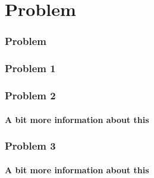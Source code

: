 \documentclass{beamer}
\begin{document}
\section{Problem}
   \begin{frame}
    \frametitle{Problem}
    \end{frame}
  \begin{frame}
    \frametitle{Problem 1}
  \end{frame}
  \begin{frame}
    \frametitle{Problem 2}
    \framesubtitle{A bit more information about this}
  \end{frame}
  \begin{frame}
    \frametitle{Problem 3}
    \framesubtitle{A bit more information about this}
  \end{frame}
\end{document}
